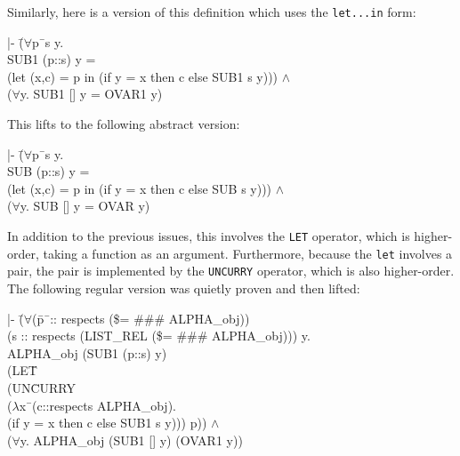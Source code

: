\documentclass[envcountsame,runningheads]{llncs}
\begin{document}
Similarly, here is a version of this definition which uses the {\tt let...in}
form:
{\tt \begin{tabbing}
|- \=($\forall$p\=\ s y. \\
\>\>  SUB1 (p::s) y = \\
\>\>  (let (x,c) = p in (if y = x then c else SUB1 s y))) $\wedge$ \\
\> ($\forall$y. SUB1 [] y = OVAR1 y)
\end{tabbing}}
This lifts to the following abstract version:
{\tt \begin{tabbing}
|- \=($\forall$p\=\ s y. \\
\>\>  SUB (p::s) y = \\
\>\>  (let (x,c) = p in (if y = x then c else SUB s y))) $\wedge$ \\
\> ($\forall$y. SUB [] y = OVAR y)
\end{tabbing}}
In addition to the previous issues, this involves the {\tt LET}
operator, which is higher-order, taking a function as an argument.
Furthermore, because the {\tt let} involves a pair, the
pair is implemented by the {\tt UNCURRY} operator, which is also higher-order.
The following regular version was quietly proven and then lifted:
{\tt \begin{tabbing}
|- \=($\forall$(\=p\=\ :: respects (\$= \#\#\# ALPHA\_obj)) \\
\>\>\> (s :: respects (LIST\_REL (\$= \#\#\# ALPHA\_obj))) y. \\
\>\>  AL\=PHA\_obj (SUB1 (p::s) y) \\
\>\>\>  (LE\=T \\
\>\>\>\>   (UN\=CURRY \\
\>\>\>\>\>    ($\lambda$x\=\ (c::respects ALPHA\_obj). \\
\>\>\>\>\>\>     (if y = x then c else SUB1 s y))) p)) $\wedge$ \\
\> ($\forall$y. ALPHA\_obj (SUB1 [] y) (OVAR1 y))
\end{tabbing}}
\end{document}
